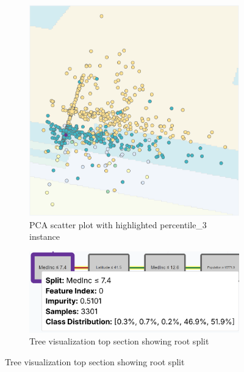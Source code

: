 \begin{figure}[p]
    \centering
    \begin{subfigure}[c]{0.48\textwidth}
        \centering
        \includegraphics[width=\textwidth,height=0.4\textheight,keepaspectratio]{images/ds_interaction_p3_highlight_scatter.png}
        \caption{PCA scatter plot with highlighted percentile\_3 instance}
        \label{fig:ds_interaction_p3_highlight_scatter}
    \end{subfigure}
    \hfill
    \begin{subfigure}[c]{0.48\textwidth}
        \centering
        \includegraphics[width=\textwidth,height=0.4\textheight,keepaspectratio]{images/ds_interaction_p3_highlight_tree_top.png}
        \caption{Tree visualization top section showing root split}
        \label{fig:ds_interaction_p3_highlight_tree_top}
    \end{subfigure}
    

\end{figure}
